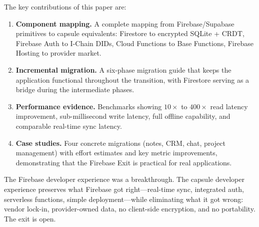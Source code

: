\documentclass[11pt,a4paper]{article}
\begin{document}
The key contributions of this paper are:

\begin{enumerate}
    \item \textbf{Component mapping.} A complete mapping from
    Firebase/Supabase primitives to capsule equivalents: Firestore
    to encrypted SQLite + CRDT, Firebase Auth to I-Chain DIDs,
    Cloud Functions to Base Functions, Firebase Hosting to provider
    market.

    \item \textbf{Incremental migration.} A six-phase migration guide
    that keeps the application functional throughout the transition,
    with Firestore serving as a bridge during the intermediate phases.

    \item \textbf{Performance evidence.} Benchmarks showing $10\times$
    to $400\times$ read latency improvement, sub-millisecond write
    latency, full offline capability, and comparable real-time sync
    latency.

    \item \textbf{Case studies.} Four concrete migrations (notes, CRM,
    chat, project management) with effort estimates and key metric
    improvements, demonstrating that the Firebase Exit is practical
    for real applications.
\end{enumerate}

The Firebase developer experience was a breakthrough. The capsule
developer experience preserves what Firebase got right---real-time sync,
integrated auth, serverless functions, simple deployment---while
eliminating what it got wrong: vendor lock-in, provider-owned data,
no client-side encryption, and no portability. The exit is open.
\end{document}
